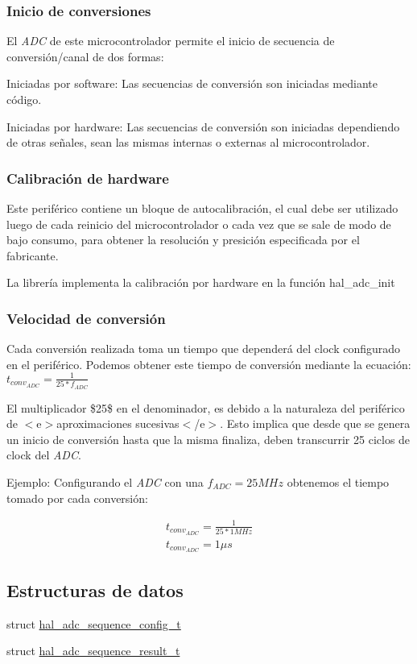 \subsubsection*{Inicio de conversiones}

El {\itshape A\+DC} de este microcontrolador permite el inicio de secuencia de conversión/canal de dos formas\+:
\begin{DoxyEnumerate}
\item Iniciadas por software\+: Las secuencias de conversión son iniciadas mediante código.
\item Iniciadas por hardware\+: Las secuencias de conversión son iniciadas dependiendo de otras señales, sean las mismas internas o externas al microcontrolador.
\end{DoxyEnumerate}\subsubsection*{Calibración de hardware}

Este periférico contiene un bloque de autocalibración, el cual debe ser utilizado luego de cada reinicio del microcontrolador o cada vez que se sale de modo de bajo consumo, para obtener la resolución y presición especificada por el fabricante.

La librería implementa la calibración por hardware en la función hal\+\_\+adc\+\_\+init

\subsubsection*{Velocidad de conversión}

Cada conversión realizada toma un tiempo que dependerá del clock configurado en el periférico. Podemos obtener este tiempo de conversión mediante la ecuación\+: $ t_{conv_{ADC}} = \frac{1}{25 * f_{ADC}} $

El multiplicador \$25\$ en el denominador, es debido a la naturaleza del periférico de $<$e$>$aproximaciones sucesivas$<$/e$>$. Esto implica que desde que se genera un inicio de conversión hasta que la misma finaliza, deben transcurrir 25 ciclos de clock del {\itshape A\+DC}.

Ejemplo\+: Configurando el {\itshape A\+DC} con una $f_{ADC} = 25MHz$ obtenemos el tiempo tomado por cada conversión\+:

\begin{eqnarray*} t_{conv_{ADC}} = \frac{1}{25 * 1MHz} \\ t_{conv_{ADC}} = 1 \mu s \end{eqnarray*} \subsection*{Estructuras de datos}
\begin{DoxyCompactItemize}
\item 
struct \hyperlink{structhal__adc__sequence__config__t}{hal\+\_\+adc\+\_\+sequence\+\_\+config\+\_\+t}
\item 
struct \hyperlink{group__ADC_structhal__adc__sequence__result__t}{hal\+\_\+adc\+\_\+sequence\+\_\+result\+\_\+t}
\end{DoxyCompactItemize}
